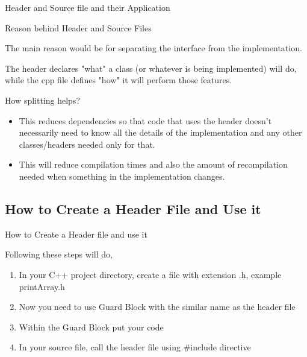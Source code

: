 \documentclass[newPxFont]{beamer}
\begin{document}
\begin{frame}[allowframebreaks]{Header and Source file and their Application}

\begin{exampleblock}{Reason behind Header and Source Files}

The main reason would be for separating the interface from the implementation. 

The header declares \alert{"what"} a class (or whatever is being implemented) will do, while the cpp file defines \alert{"how"} it will perform those features.

\end{exampleblock}

\vspace{8em}

\begin{alertblock}{How splitting helps?}

\begin{itemize}
    \item {This reduces dependencies so that code that uses the header doesn't necessarily need to know all the details of the implementation and any other classes/headers needed only for that.}
    \item {This will reduce compilation times and also the amount of recompilation needed when something in the implementation changes.}
\end{itemize}

\end{alertblock}

\end{frame}

\subsection{How to Create a Header File and Use it}

\begin{frame}{How to Create a Header file and use it}

Following these steps will do,

\begin{enumerate}
    \item {In your C++ project directory, create a file with extension \alert{.h}, example \alert{printArray.h}}
    \item {Now you need to use \alert{Guard Block} with the similar name as the header file}
    \item {Within the Guard Block put your code}
    \item {In your source file, call the header file using \alert{#include} directive}
    \end{enumerate}

\end{frame}
\end{document}
